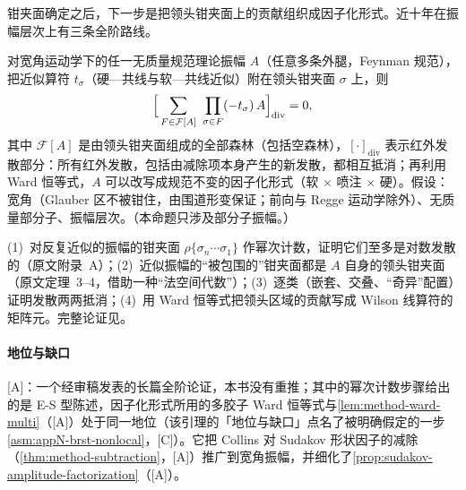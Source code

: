 钳夹面确定之后，下一步是把领头钳夹面上的贡献组织成因子化形式。近十年在振幅层次上有三条全阶路线。

\begin{proposition}\label{prop:front-ir-forest}
对宽角运动学下的任一无质量规范理论振幅 $A$（任意多条外腿，Feynman 规范），把近似算符 $t_\sigma$（硬—共线与软—共线近似）附在领头钳夹面 $\sigma$ 上，则
\begin{equation}\label{eq:front-forest}
\Bigl[\,\sum_{F\in\mathcal F[A]}\ \prod_{\sigma\in F}(-t_\sigma)\,A\Bigr]_{\mathrm{div}}=0,
\end{equation}
其中 $\mathcal F[A]$ 是由领头钳夹面组成的全部森林（包括空森林），$[\cdot]_{\mathrm{div}}$ 表示红外发散部分：所有红外发散，包括由减除项本身产生的新发散，都相互抵消；再利用 Ward 恒等式，$A$ 可以改写成规范不变的因子化形式（软 $\times$ 喷注 $\times$ 硬）\cite[式~(1.1)、(5.28)]{Ma2020}。假设：宽角（Glauber 区不被钳住，由围道形变保证；前向与 Regge 运动学除外）、无质量部分子、振幅层次。（本命题只涉及部分子振幅。）
\end{proposition}

\begin{proofsketch}
(1)~对反复近似的振幅的钳夹面 $\rho\{\sigma_n\cdots\sigma_1\}$ 作幂次计数，证明它们至多是对数发散的（原文附录~A）；(2)~近似振幅的“被包围的”钳夹面都是 $A$ 自身的领头钳夹面（原文定理~3--4，借助一种“法空间代数”）；(3)~逐类（嵌套、交叠、“奇异”配置）证明发散两两抵消；(4)~用 Ward 恒等式把领头区域的贡献写成 Wilson 线算符的矩阵元。完整论证见\cite{Ma2020}。
\end{proofsketch}

\paragraph{地位与缺口}[A]：一个经审稿发表的长篇全阶论证，本书没有重推；其中的幂次计数步骤给出的是 E-S 型陈述，因子化形式所用的多胶子 Ward 恒等式与\cref{lem:method-ward-multi}（[A]）处于同一地位（该引理的「地位与缺口」点名了被明确假定的一步\cref{asm:appN-brst-nonlocal}，[C]）。它把 Collins 对 Sudakov 形状因子的减除（\cref{thm:method-subtraction}，[A]）推广到宽角振幅，并细化了\cref{prop:sudakov-amplitude-factorization}（[A]）。

